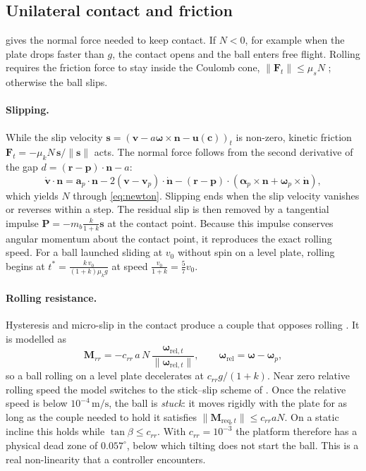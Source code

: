 \documentclass[10pt,a4paper]{article}
\newcommand{\un}[1]{\,\mathrm{#1}}
\newcommand{\vect}[1]{\bm{#1}}
\newcommand{\hatn}{\vect{n}}
\begin{document}
\subsection{Unilateral contact and friction}
 gives the normal force needed to keep contact. If $N<0$, for example when the
plate drops faster than $g$, the contact opens and the ball enters free flight. Rolling requires
the friction force to stay inside the Coulomb cone,
$\lVert\vect F_t\rVert\le\mu_sN$ \citep{johnson1985contact,popov2010contact}; otherwise the ball
slips.

\paragraph{Slipping.} While the slip velocity
$\vect s=(\vect v-a\vect\omega\times\hatn-\vect u(\vect c))_t$ is non-zero, kinetic friction
$\vect F_t=-\mu_kN\,\vect s/\lVert\vect s\rVert$ acts. The normal force follows from the second
derivative of the gap $d=(\vect r-\vect p)\cdot\hatn-a$:
\begin{equation}
  \dot{\vect v}\cdot\hatn=\vect a_p\cdot\hatn-2(\vect v-\vect v_p)\cdot\dot{\hatn}
  -(\vect r-\vect p)\cdot\left(\vect\alpha_p\times\hatn+\vect\omega_p\times\dot{\hatn}\right),
\end{equation}
which yields $N$ through \eqref{eq:newton}. Slipping ends when the slip velocity vanishes or
reverses within a step. The residual slip is then removed by a tangential impulse
$\vect P=-m_b\frac{k}{1+k}\vect s$ at the contact point. Because this impulse conserves angular
momentum about the contact point, it reproduces the exact rolling speed. For a ball launched
sliding at $v_0$ without spin on a level plate, rolling begins at
$t^*=\frac{k\,v_0}{(1+k)\mu_kg}$ at speed $\frac{v_0}{1+k}=\frac57v_0$.

\paragraph{Rolling resistance.} Hysteresis and micro-slip in the contact produce a couple that
opposes rolling \citep{johnson1985contact}. It is modelled as
\begin{equation}
  \vect M_{rr}=-c_{rr}\,a\,N\,\frac{\vect\omega_{\mathrm{rel},t}}{\lVert\vect\omega_{\mathrm{rel},t}\rVert},\qquad
  \vect\omega_{\mathrm{rel}}=\vect\omega-\vect\omega_p,
\end{equation}
so a ball rolling on a level plate decelerates at $c_{rr}g/(1+k)$. Near zero relative rolling
speed the model switches to the stick--slip scheme of \citet{karnopp1985computer}. Once the
relative speed is below $10^{-4}\un{m/s}$, the ball is \emph{stuck}: it moves rigidly with the
plate for as long as the couple needed to hold it satisfies
$\lVert\vect M_{\mathrm{req},t}\rVert\le c_{rr}aN$. On a static incline this holds while
$\tan\beta\le c_{rr}$. With $c_{rr}=10^{-3}$ the platform therefore has a physical dead zone of
$0.057^\circ$, below which tilting does not start the ball. This is a real non-linearity that a
controller encounters.
\end{document}
